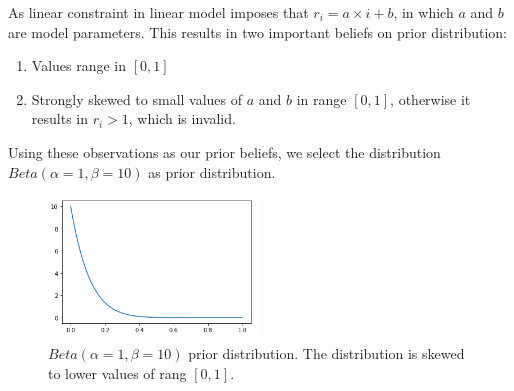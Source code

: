 \documentclass[12pt]{article}
\theoremstyle{definition}
\begin{document}
As linear constraint in linear model imposes that $r_i = a\times i + b$, in
which $a$ and $b$ are model parameters. This results in two important beliefs on
prior distribution:
\begin{enumerate}
\item Values range in $[0,1]$
\item Strongly skewed to small values of $a$ and $b$ in range $[0,1]$, otherwise it results in
  $r_i>1$, which is invalid.
\end{enumerate}
Using these observations as our prior beliefs, we select the distribution
$Beta(\alpha=1,\beta=10)$ as prior distribution.
\begin{figure}[H]
  \centering
  \includegraphics[width=0.5\textwidth,keepaspectratio]{figures/beta_1_10.png}
  \caption{$Beta(\alpha=1,\beta=10)$ prior distribution. The distribution is
    skewed to lower values of rang $[0,1]$.}
\end{figure}
\end{document}
